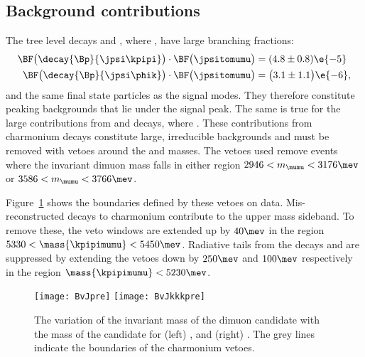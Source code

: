 \subsection{Background contributions}
The tree level decays \decay{\Bp}{\jpsi\kpipi} and \decay{\Bp}{\jpsi\phik}, where
\decay{\jpsi}{\mumu}, have large branching fractions:
\begin{align}
  \BF\big(\decay{\Bp}{\jpsi\kpipi}\big)
  \cdot \BF\big(\jpsitomumu\big)
  &= (4.8 \pm 0.8)\e{-5} \\
  \BF\big(\decay{\Bp}{\jpsi\phik}\big)
  \cdot \BF\big(\jpsitomumu\big)
  &= \big(3.1 \pm 1.1\big)\e{-6},
\end{align}
and the same final state particles as the signal modes.
They therefore constitute peaking backgrounds that lie under the signal peak.
The same is true for the large contributions from \decay{\Bp}{\psitwos\kpipi} and
\decay{\Bp}{\psitwos\phik} decays, where \decay{\psitwos}{\mumu}.
These contributions from charmonium decays constitute large, irreducible backgrounds and must be
removed with vetoes around the \jpsi and \psitwos masses.
The vetoes used remove events where the invariant dimuon mass falls in either region
$2946<m_{\mumu}<3176\mev$ or $3586<m_{\mumu}<3766\mev$.

Figure~\ref{fig:hhh:charmvetoes} shows the boundaries defined by these vetoes on data.
Mis-reconstructed decays to charmonium contribute to the upper mass sideband.
To remove these, the veto windows are extended up by $40\mev$ in the region
$5330<\mass{\kpipimumu}<5450\mev$.
Radiative tails from the decays \decay{\jpsi}{\mumu\gamma} and \decay{\psitwos}{\mumu\gamma} are
suppressed by extending the vetoes down by $250\mev$ and $100\mev$ respectively in the region
$\mass{\kpipimumu}<5230\mev$.


\begin{figure}
  \begin{center}
    \texttt{[image: BvJpre]}
    \texttt{[image: BvJkkkpre]}
    \caption[Charmonium vetoes is in \btokpipimumu and \btophikmumu]
    {
      The variation of the invariant mass of the dimuon candidate with the mass of the \Bp
      candidate for
      (left) \btokpipimumu, and
      (right) \btophikmumu.
      The grey lines indicate the boundaries of the charmonium vetoes.
    }
    \label{fig:hhh:charmvetoes}
  \end{center}
\end{figure}

